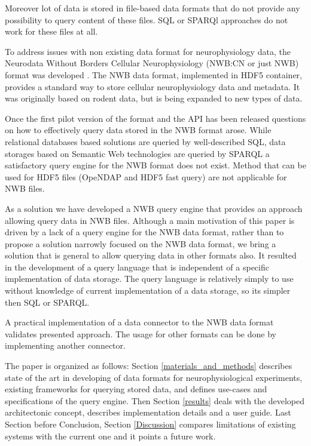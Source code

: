 \documentclass[utf8]{frontiersSCNS} %
\begin{document}
Moreover lot of data is stored in file-based data formats that do not provide any possibility to query content of these files. SQL or SPARQl approaches do not work for these files at all. 

To address issues with non existing data format for neurophysiology data, the Neurodata Without Borders Cellular Neurophysiology (NWB:CN or just NWB) format was developed \citep{teeters-neuron}. The NWB data format, implemented in HDF5 container, provides a standard way to store cellular neurophysiology data and metadata. It was originally based on rodent data, but is being expanded to new types of data. 

Once the first pilot version of the format and the API has been released questions on how to effectively query data stored in the NWB format arose. While relational databases based solutions are queried by well-described SQL, data storages based on Semantic Web technologies are queried by SPARQL a satisfactory query engine for the NWB format does not exist. Method that can be used for HDF5 files (OpeNDAP and HDF5 fast query) are not applicable for NWB files.

As a solution we have developed a NWB query engine that provides an approach allowing query data in NWB files. Although a main motivation of this paper is driven by a lack of a query engine for the NWB data format, rather than to propose a solution narrowly focused on the NWB data format, we bring a solution that is general to allow querying data in other formats also. It resulted in the development of a query language that is independent of a specific implementation of data storage. The query language is relatively simply to use without knowledge of current implementation of a data storage, so its simpler then SQL or SPARQL.

A practical implementation of a data connector to the NWB data format validates presented approach. The usage for other formats can be done by implementing another connector.

The paper is organized as follows: Section \ref{materials_and_methods} describes state of the art in developing of data formats for neurophysiological experiments, existing frameworks for querying stored data, and defines use-cases and specifications of the query engine. Then Section  \ref{results}  deals with the developed architectonic concept, describes implementation details and a user guide. Last Section before Conclusion, Section  \ref{Discussion} compares limitations of existing systems with the current one and it points a future work. 
\end{document}

